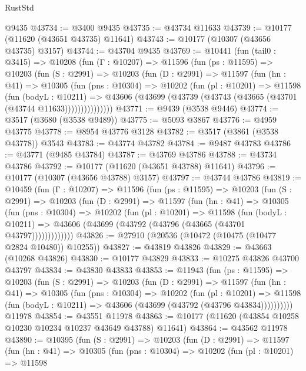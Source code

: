 \begin{lexlean}{RustStd}
\begin{coremodule}
    @9435
@43734 := @3400 @9435
@43735 := @43734 @11633
@43739 := @10177 (@11620 (@43651 @43735) @11641)
@43743 := @10177 (@10307 (@43656 @43735) @3157)
@43744 := @43704 @9435
@43769 := @10441
    (fun (tail0 : @3415) =>
    @10208
      (fun (Γ : @10207) =>
      @11596
        (fun (ps : @11595) =>
        @10203
          (fun (S : @2991) =>
          @10203
            (fun (D : @2991) =>
            @11597
              (fun (hn : @41) =>
              @10305
                (fun (pns : @10304) =>
                @10202
                  (fun (pl : @10201) =>
                  @11598
                    (fun (bodyL : @10211) =>
                    @43606 (@43699 (@43739 (@43743 (@43665 (@43701 (@43744 @11633)))))))))))))))
@43771 := @9439 (@3538 @9446)
@43774 := @3517 (@3680 (@3538 @9489))
@43775 := @5093 @3867
@43776 := @4959 @43775
@43778 := @8954 @43776 @3128
@43782 := @3517 (@3861 (@3538 @43778)) @3543
@43783 := @43774 @43782
@43784 := @9487 @43783
@43786 := @43771 (@9485 @43784)
@43787 := @43769 @43786
@43788 := @43734 @43786
@43792 := @10177 (@11620 (@43651 @43788) @11641)
@43796 := @10177 (@10307 (@43656 @43788) @3157)
@43797 := @43744 @43786
@43819 := @10459
    (fun (Γ : @10207) =>
    @11596
      (fun (ps : @11595) =>
      @10203
        (fun (S : @2991) =>
        @10203
          (fun (D : @2991) =>
          @11597
            (fun (hn : @41) =>
            @10305
              (fun (pns : @10304) =>
              @10202
                (fun (pl : @10201) =>
                @11598
                  (fun (bodyL : @10211) =>
                  @43606 (@43699 (@43792 (@43796 (@43665 (@43701 @43797)))))))))))))
@43826 := @27910 (@20536 (@10472 (@10475 (@10477 @2824 @10480)) @10255))
@43827 := @43819 @43826
@43829 := @43663 (@10268 @43826)
@43830 := @10177 @43829
@43833 := @10275 @43826 @43700 @43797
@43834 := @43830 @43833
@43853 := @11943
    (fun (ps : @11595) =>
    @10203
      (fun (S : @2991) =>
      @10203
        (fun (D : @2991) =>
        @11597
          (fun (hn : @41) =>
          @10305
            (fun (pns : @10304) =>
            @10202
              (fun (pl : @10201) =>
              @11598 (fun (bodyL : @10211) => @43606 (@43699 (@43792 (@43796 @43834))))))))))
    @11978
@43854 := @43551 @11978
@43863 := @10177 (@11620 (@43854 @10258 @10230 @10234 @10237 @43649 @43788) @11641)
@43864 := @43562 @11978
@43890 := @10395
    (fun (S : @2991) =>
    @10203
      (fun (D : @2991) =>
      @11597
        (fun (hn : @41) =>
        @10305
          (fun (pns : @10304) =>
          @10202
            (fun (pl : @10201) =>
            @11598

\end{coremodule}
\end{lexlean}

